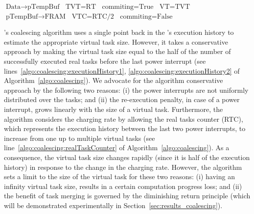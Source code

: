 \begin{algorithm}[t]
\begin{algorithmic}[1]
				\State {}
				\State $\text{Data} \rightarrow \text{pTempBuf}$ 
				\State $\text{TVT} = \text{RT}$ 
				\State $\text{commiting} = \text{True}$ \label{algo:coalescing:firmTransition2}
				\State 
				\State $\text{VT} = \text{TVT}$ \label{commitStage}
				\State $\text{pTempBuf} \rightarrow \text{FRAM}$ 
				\State $\text{VTC} = \text{RTC/2}$ 		 \label{algo:coalescing:executionHistory2}
				\State $\text{commiting} = \text{False}$ 

			\EndWhile

		\EndFunction
			
	\end{algorithmic}
\end{algorithm}

\sys's coalescing algorithm uses a single point back in the \sys's execution history to estimate the appropriate virtual task size. However, it takes a conservative approach by making the virtual task size equal to the half of the number of successfully executed real tasks before the last power interrupt (see lines~\ref{algo:coalescing:executionHistory1}, \ref{algo:coalescing:executionHistory2} of Algorithm~\ref{algo:coalescing}). We advocate for the algorithm conservative approach by the following two reasons: (i) the power interrupts are not uniformly distributed over the tasks; and (ii) the re-execution penalty, in case of a power interrupt, grows linearly with the size of a virtual task. Furthermore, the algorithm considers the charging rate by allowing the real tasks counter (RTC), which represents the execution history between the last two power interrupts, to increase from one up to multiple virtual tasks (see line~\ref{algo:coalescing:realTaskCounter} of Algorithm~\ref{algo:coalescing}). As a consequence, the virtual task size changes rapidly (since it is half of the execution history) in response to the change in the charging rate. However, the algorithm sets a limit to the size of the virtual task for these two reasons: (i) having an infinity virtual task size, results in a certain computation progress loss; and (ii) the benefit of task merging is governed by the diminishing return principle (which will be demonstrated experimentally in Section~\ref{sec:results_coalescing}).

